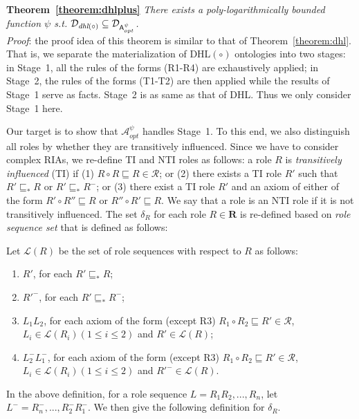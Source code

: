 \documentclass[final,1p,times]{elsarticle}
\begin{document}
\textbf{Theorem~\ref{theorem:dhlplus}}
\emph{There exists a poly-logarithmically bounded function $\psi$ s.t. $\mathcal{D}_{\textit{\text{dhl}}(\circ)}\subseteq\mathcal{D}_{\mathsf{A}_{opt}^{\psi}}$.}\\

\noindent\emph{Proof}: the proof idea of this theorem is similar to that of Theorem~\ref{theorem:dhl}.
That is, we separate the materialization of DHL$(\circ)$ ontologies into two stages: in Stage~1,
all the rules of the forms (R1-R4) are exhaustively applied; in Stage~2, the rules of the forms (T1-T2)
are then applied while the results of Stage~1 serve as facts. Stage~2 is as same as that of DHL.
Thus we only consider Stage~1 here.

Our target is to show that $\mathcal{A}_{opt}^\psi$ handles Stage~1. To this end, we also
distinguish all roles by whether they are transitively influenced. Since we have to consider
complex RIAs, we re-define TI and NTI roles as follows:
a role $R$ is \emph{transitively influenced} (TI)
if (1) $R\circ R\sqsubseteq R\in\mathcal{R}$; or
(2) there exists a TI role $R'$ such that $R'\sqsubseteq_*R$ or $R'\sqsubseteq_*R^-$;
or (3) there exist a TI role $R'$ and an axiom of either of the form
$R'\circ R''\sqsubseteq R$ or $R''\circ R'\sqsubseteq R$.
We say that a role is an NTI role if it is not transitively influenced.
The set $\delta_R$ for each role $R\in\textbf{R}$ is re-defined based on \emph{role sequence set}
that is defined as follows:

\begin{definition}\label{def:language}
Let $\mathcal{L}(R)$ be the set of role sequences with respect to $R$ as follows:
 \begin{enumerate}[leftmargin=4ex,label=\arabic*.]
\item $R'$, for each $R'\sqsubseteq_* R$;
\item $R'^-$, for each $R'\sqsubseteq_* R^-$;
\item $L_1L_2$, for each axiom of the form (except R3) $R_1\circ R_2\sqsubseteq R'\in\mathcal{R}$, $L_i\in\mathcal{L}(R_i)(1\leq i\leq 2)$ and $R'\in\mathcal{L}(R)$;
\item $L_2^-L_1^-$, for each axiom of the form (except R3) $R_1\circ R_2\sqsubseteq R'\in\mathcal{R}$, $L_i\in\mathcal{L}(R_i)(1\leq i\leq 2)$ and $R'^-\in\mathcal{L}(R)$.
\end{enumerate}
\end{definition}

In the above definition, for a role sequence $L=R_1R_2,...,R_n$, let $L^-=R_n^-,...,R_2^-R_1^-$.
We then give the following definition for $\delta_R$.
\end{document}
